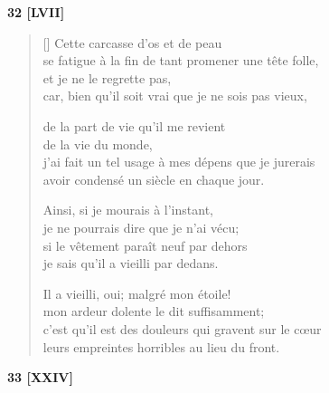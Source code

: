 \documentclass[a4paper,12pt]{book}
\begin{document}
\bigskip

\begin{center}
  \textbf{32 [LVII]}
\end{center}

\settowidth{\versewidth}{horribles gravent sur le cœur, si ce n'est au front.}

\begin{verse}[\versewidth]
  Cette carcasse d'os et de peau \\
  se fatigue à la fin de tant promener une tête folle, \\
  et je ne le regrette pas, \\
  car, bien qu'il soit vrai que je ne sois pas vieux,

  de la part de vie qu'il me revient \\
  de la vie du monde, \\
  j'ai fait un tel usage à mes dépens que je jurerais \\
  avoir condensé un siècle en chaque jour.

  Ainsi, si je mourais à l'instant, \\
  je ne pourrais dire que je n'ai vécu; \\
  si le vêtement paraît neuf par dehors \\
  je sais qu'il a vieilli par dedans.

  Il a vieilli, oui; malgré mon étoile! \\
  mon ardeur dolente le dit suffisamment; \\
  c'est qu'il est des douleurs qui gravent sur le cœur \\
  leurs empreintes horribles au lieu du front.
\end{verse}

\bigskip

\begin{center}
  \textbf{33 [XXIV]}
\end{center}

\settowidth{\versewidth}{deux baisers qui à l'unisson éclatent,}
\end{document}
